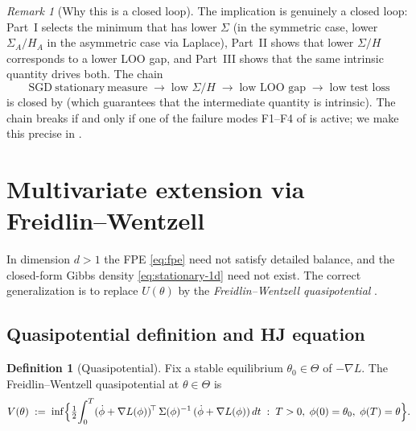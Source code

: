 \documentclass[11pt,a4paper]{article}
\theoremstyle{definition}
\newtheorem{definition}[theorem]{Definition}
\theoremstyle{remark}
\newtheorem{remark}[theorem]{Remark}
\begin{document}
\begin{remark}[Why this is a closed loop]\label{rem:closed-loop}
   The implication is genuinely a closed loop: Part~I selects the minimum
   that has lower $\Sigma$ (in the symmetric case, lower
   $\Sigma_A/H_A$ in the asymmetric case via Laplace), Part~II shows
   that lower $\Sigma/H$ corresponds to a lower LOO gap, and Part~III
   shows that the same intrinsic quantity drives both.  The chain
   \[
      \mathrm{SGD\ stationary\ measure}
      \;\longrightarrow\; \text{low } \Sigma/H
      \;\longrightarrow\; \text{low LOO gap}
      \;\longrightarrow\; \text{low test loss}
   \]
   is closed by  (which guarantees that the
   intermediate quantity is intrinsic).  The chain breaks if and only if
   one of the failure modes F1--F4 of \cite{paperB} is active; we make
   this precise in .
\end{remark}

\section{Multivariate extension via Freidlin--Wentzell}\label{sec:multi}

In dimension $d>1$ the FPE \eqref{eq:fpe} need not satisfy detailed balance,
and the closed-form Gibbs density \eqref{eq:stationary-1d} need not exist.
The correct generalization is to replace $U(\theta)$ by the
\emph{Freidlin--Wentzell quasipotential} \cite{FreidlinWentzell2012}.

\subsection{Quasipotential definition and HJ equation}

\begin{definition}[Quasipotential]\label{def:quasi}
   Fix a stable equilibrium $\theta_0\in\Theta$ of $-\nabla L$.  The
   Freidlin--Wentzell quasipotential at $\theta\in\Theta$ is
   \begin{equation}\label{eq:quasipotential}
      V(\theta) \;:=\;
      \inf\Bigl\{\tfrac{1}{2}\!\int_0^T
            (\dot\phi + \nabla L(\phi))^{\!\top}\,
            \Sigma(\phi)^{-1}\,(\dot\phi + \nabla L(\phi))\,dt
         \;:\;
         T>0,\;\phi(0)=\theta_0,\;\phi(T)=\theta\Bigr\}.
   \end{equation}
\end{definition}
\end{document}
